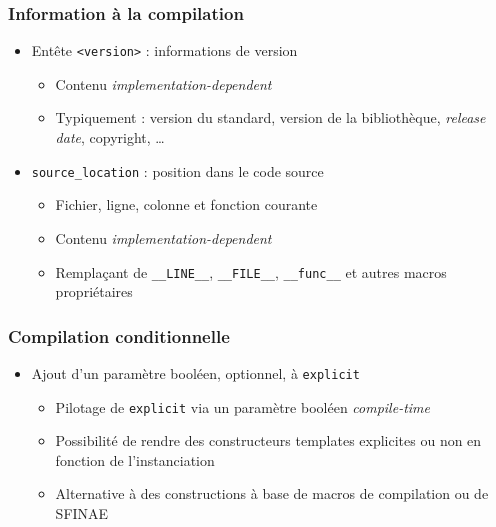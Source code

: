 \documentclass[C++.tex]{subfiles}
\begin{document}
\begin{frame}[fragile]
	\frametitle{Information à la compilation}
	\begin{itemize}
		\item Entête \lstinline|<version>| : informations de version
		\begin{itemize}
			\item Contenu \textit{implementation-dependent}
			\item Typiquement : version du standard, version de la bibliothèque, \textit{release date}, copyright, \ldots
		\end{itemize}
		
		\item \lstinline|source_location| : position dans le code source
		\begin{itemize}
			\item Fichier, ligne, colonne et fonction courante
			\item Contenu \textit{implementation-dependent}


			\item Remplaçant de \lstinline|__LINE__|, \lstinline|__FILE__|, \lstinline|__func__| et autres macros propriétaires
		\end{itemize}
	\end{itemize}
\end{frame}

\begin{frame}[fragile]
	\frametitle{Compilation conditionnelle}
	\begin{itemize}
		\item Ajout d'un paramètre booléen, optionnel, à \lstinline|explicit|
		\begin{itemize}
			\item Pilotage de \lstinline|explicit| via un paramètre booléen \textit{compile-time}
			\item Possibilité de rendre des constructeurs templates explicites ou non en fonction de l'instanciation
			\item Alternative à des constructions à base de macros de compilation ou de SFINAE
		\end{itemize}
	\end{itemize}
\end{frame}
\end{document}
